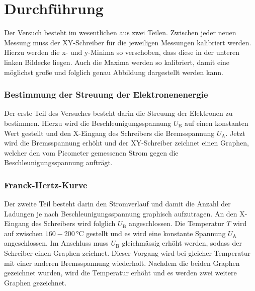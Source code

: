 \section{Durchführung}
\label{sec:Durchführung}
Der Versuch besteht im wesentlichen aus zwei Teilen. Zwischen jeder neuen Messung muss der XY-Schreiber für die jeweiligen Messungen kalibriert werden.
Hierzu werden die x- und y-Minima so verschoben, dass diese in der unteren linken Bildecke liegen. Auch die Maxima werden so kalibriert, damit eine möglichst große und folglich genau Abbildung dargestellt werden kann.

\subsubsection{Bestimmung der Streuung der Elektronenenergie}
\label{sec:Bestimmung der Streuung der Elektronenenergie}
Der erste Teil des Versuches besteht darin die Streuung der Elektronen zu bestimmen.
Hierzu wird die Beschleunigungsspannung $U_{\text{B}}$ auf einen konstanten Wert gestellt und den X-Eingang des Schreibers die Bremsspannung $U_{\text{A}}$.
Jetzt wird die Bremsspannung erhöht und der XY-Schreiber zeichnet einen Graphen, welcher den vom Picometer gemessenen Strom gegen die Beschleunigungsspannung aufträgt.

\subsubsection{Franck-Hertz-Kurve}
\label{sec:Franck-Hertz-Kurve}
Der zweite Teil besteht darin den Stromverlauf und damit die Anzahl der Ladungen je nach Beschleunigungsspannung graphisch aufzutragen.
An den X-Eingang des Schreibers wird folglich $U_{\text{B}}$ angeschlossen. Die Temperatur $T$ wird auf zwischen $160-200\, \unit{\celsius}$ gestellt und es wird eine konstante Spannung $U_{\text{A}}$ angeschlossen.
Im Anschluss muss $U_{\text{B}}$ gleichmässig erhöht werden, sodass der Schreiber einen Graphen zeichnet. Dieser Vorgang wird bei gleicher Temperatur mit einer anderen Bremsspannung wiederholt.
Nachdem die beiden Graphen gezeichnet wurden, wird die Temperatur erhöht und es werden zwei weitere Graphen gezeichnet.


